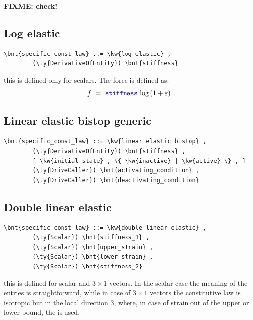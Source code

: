 \textbf{FIXME: check!}

\subsection{Log elastic}
\begin{Verbatim}[commandchars=\\\{\}]
    \bnt{specific_const_law} ::= \kw{log elastic} ,
        (\ty{DerivativeOfEntity}) \bnt{stiffness}
\end{Verbatim}
this is defined only for scalars. The force is defined as:
\begin{displaymath}
    f \ = \ \textcolor{blue}{\texttt{stiffness}} \ \mathrm{log}\left( 1 + \varepsilon \right)
\end{displaymath}
  
\subsection{Linear elastic bistop generic}
\begin{Verbatim}[commandchars=\\\{\}]
    \bnt{specific_const_law} ::= \kw{linear elastic bistop} ,
        (\ty{DerivativeOfEntity}) \bnt{stiffness} ,
        [ \kw{initial state} , \{ \kw{inactive} | \kw{active} \} , ]
        (\ty{DriveCaller}) \bnt{activating_condition} ,
        (\ty{DriveCaller}) \bnt{deactivating_condition}
\end{Verbatim}
  
\subsection{Double linear elastic}
\begin{Verbatim}[commandchars=\\\{\}]
    \bnt{specific_const_law} ::= \kw{double linear elastic} ,
        (\ty{Scalar}) \bnt{stiffness_1} ,
        (\ty{Scalar}) \bnt{upper_strain} ,
        (\ty{Scalar}) \bnt{lower_strain} ,
        (\ty{Scalar}) \bnt{stiffness_2}
\end{Verbatim}
this is defined for scalar and $3 \times 1$ vectors. In the scalar case the
meaning of the entries is straightforward,
while in case of $3 \times 1$ vectors the constitutive law is isotropic
but in the local direction 3, where, in case of strain
out of the upper or lower bound, the  is used.

